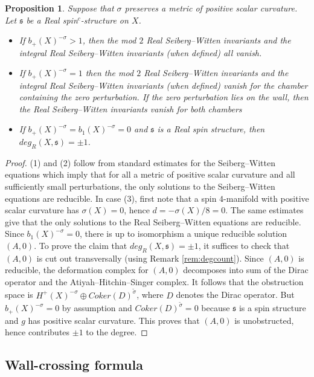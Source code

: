 \documentclass{amsart}
\newtheorem{proposition}[theorem]{Proposition}
\theoremstyle{definition}
\theoremstyle{remark}
\numberwithin{equation}{section}
\begin{document}
\begin{proposition}
Suppose that $\sigma$ preserves a metric of positive scalar curvature. Let $\mathfrak{s}$ be a Real spin$^c$-structure on $X$.
\begin{itemize}
\item[(1)]{If $b_+(X)^{-\sigma} > 1$, then the mod $2$ Real Seiberg--Witten invariants and the integral Real Seiberg--Witten invariants (when defined) all vanish.}
\item[(2)]{If $b_+(X)^{-\sigma} = 1$ then the mod $2$ Real Seiberg--Witten invariants and the integral Real Seiberg--Witten invariants (when defined) vanish for the chamber containing the zero perturbation. If the zero perturbation lies on the wall, then the Real Seiberg--Witten invariants vanish for both chambers}
\item[(3)]{If $b_+(X)^{-\sigma} = b_1(X)^{-\sigma} = 0$ and $\mathfrak{s}$ is a Real spin structure, then $deg_R(X , \mathfrak{s}) = \pm 1$.}
\end{itemize}

\end{proposition}
\begin{proof}
(1) and (2) follow from standard estimates for the Seiberg--Witten equations which imply that for all a metric of positive scalar curvature and all sufficiently small perturbations, the only solutions to the Seiberg--Witten equations are reducible. In case (3), first note that a spin $4$-manifold with positive scalar curvature has $\sigma(X) = 0$, hence $d = -\sigma(X)/8 = 0$. The same estimates give that the only solutions to the Real Seiberg--Witten equations are reducible. Since $b_1(X)^{-\sigma} = 0$, there is up to isomorphism a unique reducible solution $(A,0)$. To prove the claim that $deg_R(X , \mathfrak{s}) = \pm 1$, it suffices to check that $(A,0)$ is cut out transversally (using Remark \ref{rem:degcount}). Since $(A,0)$ is reducible, the deformation complex for $(A,0)$ decomposes into sum of the Dirac operator and the Atiyah--Hitchin--Singer complex. It follows that the obstruction space is $H^+(X)^{-\sigma} \oplus Coker(D)^{\widetilde{\sigma}}$, where $D$ denotes the Dirac operator. But $b_+(X)^{-\sigma} = 0$ by assumption and $Coker(D)^{\widetilde{\sigma}} = 0$ because $\mathfrak{s}$ is a spin structure and $g$ has positive scalar curvature. This proves that $(A,0)$ is unobstructed, hence contributes $\pm 1$ to the degree.
\end{proof}

\subsection{Wall-crossing formula}\label{sec:wcf}
\end{document}
